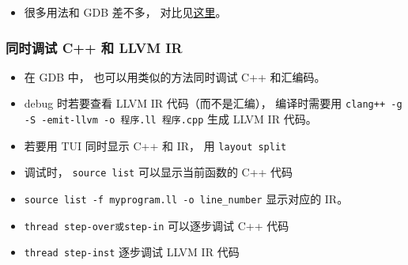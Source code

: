
\begin{issues}
\issueDraft
\end{issues}


\begin{itemize}
\item 很多用法和 GDB 差不多， 对比见\href{https://lldb.llvm.org/use/map.html}{这里}。
\end{itemize}

\subsubsection{同时调试 C++ 和 LLVM IR}
\begin{itemize}
\item 在 GDB 中， 也可以用类似的方法同时调试 C++ 和汇编码。
\item debug 时若要查看 LLVM IR 代码（而不是汇编）， 编译时需要用 \verb|clang++ -g -S -emit-llvm -o 程序.ll 程序.cpp| 生成 LLVM IR 代码。
\item 若要用 TUI 同时显示 C++ 和 IR， 用 \verb|layout split|
\item 调试时， \verb|source list| 可以显示当前函数的 C++ 代码
\item \verb|source list -f myprogram.ll -o line_number| 显示对应的 IR。
\item \verb|thread step-over或step-in| 可以逐步调试 C++ 代码
\item \verb|thread step-inst| 逐步调试 LLVM IR 代码
\end{itemize}

